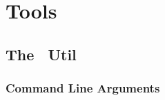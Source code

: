 
\chapter{Tools}

\section{The \ExBib\ Util}

\subsection{Command Line Arguments}


\INCOMPLETE


\endinput
%
